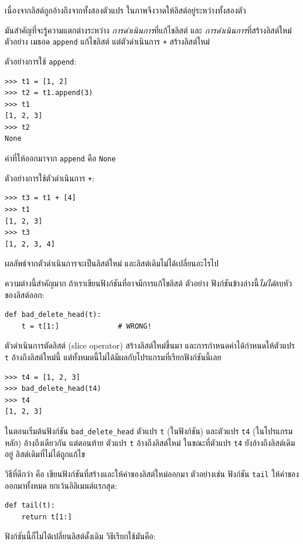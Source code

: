 เนื่องจากลิสต์ถูกอ้างถึงจากทั้งสองตัวแปร ในภาพจึงวาดให้ลิสต์อยู่ระหว่างทั้งสองตัว

มันสำคัญที่จะรู้ความแตกต่างระหว่าง
\textit{การดำเนินการ}ที่แก้ไขลิสต์
และ
\textit{การดำเนินการ}ที่สร้างลิสต์ใหม่
ตัวอย่าง เมธอด \texttt{append} แก้ไขลิสต์
แต่ตัวดำเนินการ \texttt{+} สร้างลิสต์ใหม่

ตัวอย่างการใช้ \texttt{append}:
%
\begin{verbatim}
>>> t1 = [1, 2]
>>> t2 = t1.append(3)
>>> t1
[1, 2, 3]
>>> t2
None
\end{verbatim}
%
ค่าที่ให้ออกมาจาก \texttt{append} คือ \texttt{None}

ตัวอย่างการใช้ตัวดำเนินการ \texttt{+}:
%
\begin{verbatim}
>>> t3 = t1 + [4]
>>> t1
[1, 2, 3]
>>> t3
[1, 2, 3, 4]
\end{verbatim}
%
ผลลัพธ์จากตัวดำเนินการจะเป็นลิสต์ใหม่
และลิสต์เดิมไม่ได้เปลี่ยนอะไรไป

ความต่างนี้สำคัญมาก ถ้าเราเขียนฟังก์ชันที่อาจมีการแก้ไขลิสต์
ตัวอย่าง ฟังก์ชันข้างล่างนี้\emph{ไม่ได้}ลบหัวของลิสต์ออก:
%
\begin{verbatim}
def bad_delete_head(t):
    t = t[1:]              # WRONG!
\end{verbatim}
%
ตัวดำเนินการตัดลิสต์ (slice operator) สร้างลิสต์ใหม่ขึ้นมา
และการกำหนดค่าได้กำหนดให้ตัวแปร \texttt{t} อ้างถึงลิสต์ใหม่นี้
แต่ทั้งหมดนี้ไม่ได้มีผลกับโปรแกรมที่เรียกฟังก์ชันนี้เลย
%
\begin{verbatim}
>>> t4 = [1, 2, 3]
>>> bad_delete_head(t4)
>>> t4
[1, 2, 3]
\end{verbatim}
%
ในตอนเริ่มต้นฟังก์ชัน \verb|bad_delete_head| ตัวแปร \texttt{t} (ในฟังก์ชัน) และตัวแปร \texttt{t4} (ในโปรแกรมหลัก) อ้างถึงเดียวกัน
แต่ตอนท้าย ตัวแปร \texttt{\tt t} อ้างถึงลิสต์ใหม่
ในขณะที่ตัวแปร \texttt{t4} ยังอ้างถึงลิสต์เดิมอยู่ ลิสต์เดิมที่ไม่ได้ถูกแก้ไข

วิธีที่ดีกว่า คือ เขียนฟังก์ชันที่สร้างและให้ค่าของลิสต์ใหม่ออกมา
ตัวอย่างเช่น ฟังก์ชัน \texttt{tail} ให้ค่าของออกมาทั้งหมด ยกเว้นอิลิเมนต์แรกสุด:

\begin{verbatim}
def tail(t):
    return t[1:]
\end{verbatim}
%
ฟังก์ชันนี้ก็ไม่ได้เปลี่ยนลิสต์ดั้งเดิม
วิธีเรียกใช้มันคือ:


